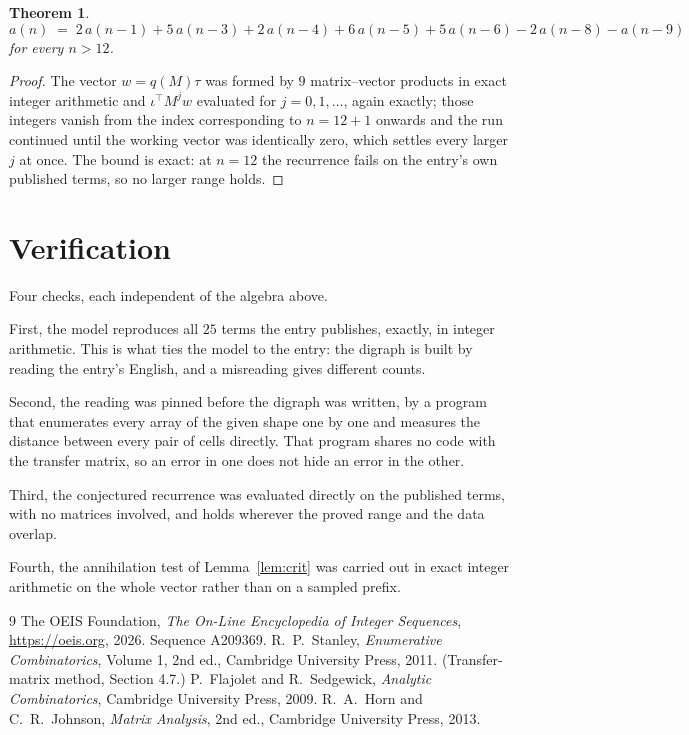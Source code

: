 \documentclass[11pt,a4paper]{article}
\theoremstyle{plain}
\newtheorem{theorem}{Theorem}
\theoremstyle{definition}
\begin{document}
\begin{theorem}
\[
a(n)\;=\;2\,a(n-1) + 5\,a(n-3) + 2\,a(n-4) + 6\,a(n-5) + 5\,a(n-6) - 2\,a(n-8) - a(n-9)
\]
for every $n>12$.
\end{theorem}

\begin{proof}
The vector $w=q(M)\tau$ was formed by $9$ matrix--vector products in exact integer
arithmetic and $\iota^{\!\top}M^{j}w$ evaluated for $j=0,1,\dots$, again exactly; those
integers vanish from the index corresponding to $n=12+1$ onwards and the run continued
until the working vector was identically zero, which settles every larger $j$ at once. The bound is exact: at $n=12$ the recurrence fails on the entry's own published terms, so no larger range holds.
\end{proof}

\section{Verification}

Four checks, each independent of the algebra above.

First, the model reproduces all $25$ terms the entry publishes, exactly, in integer
arithmetic. This is what ties the model to the entry: the digraph is built by reading the
entry's English, and a misreading gives different counts.

Second, the reading was pinned before the digraph was written, by a program that enumerates
every array of the given shape one by one and measures the distance between every pair
of cells directly. That program shares no code with the transfer matrix, so an error in one does not
hide an error in the other.

Third, the conjectured recurrence was evaluated directly on the published terms, with no
matrices involved, and holds wherever the proved range and the data overlap.

Fourth, the annihilation test of Lemma~\ref{lem:crit} was carried out in exact integer
arithmetic on the whole vector rather than on a sampled prefix.

\begin{thebibliography}{9}
 The OEIS Foundation, \emph{The On-Line Encyclopedia of Integer
Sequences}, \url{https://oeis.org}, 2026. Sequence A209369.
 R.~P.~Stanley, \emph{Enumerative Combinatorics}, Volume 1, 2nd ed.,
Cambridge University Press, 2011. (Transfer-matrix method, Section 4.7.)
 P.~Flajolet and R.~Sedgewick, \emph{Analytic Combinatorics}, Cambridge
University Press, 2009.
 R.~A.~Horn and C.~R.~Johnson, \emph{Matrix Analysis}, 2nd ed., Cambridge
University Press, 2013.
\end{thebibliography}
\end{document}
